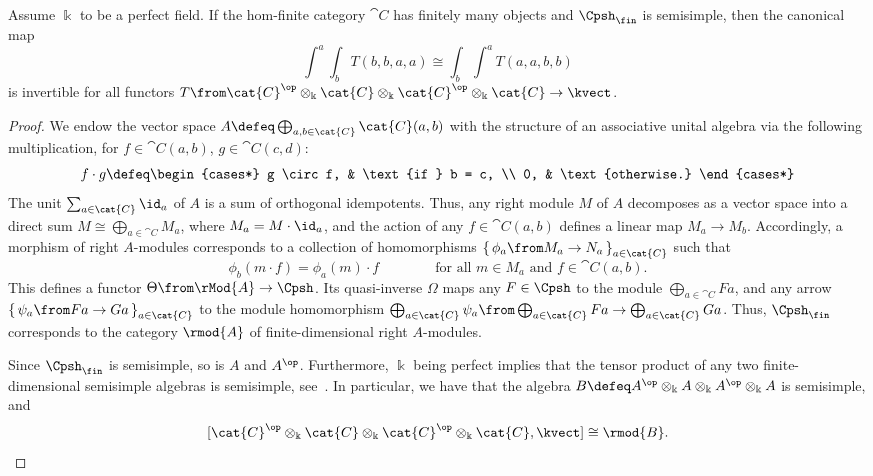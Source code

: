 \begin{lemma}\label{lem:semisimple-lets-ends-commute}
  Assume \(\Bbbk\) to be a perfect field.
  If the hom-finite category \(\cat{C}\) has finitely many objects
  and \(\Cpsh_{\fin}\)  is semisimple,
  then the canonical map
  \[
    \int^a\!\int_b T(b,b,a,a) \cong \int_b \int^a T(a,a,b,b)
  \]
  is invertible for all functors \(T \from \cat{C}^{\op}\otimes_{\Bbbk}\cat{C} \otimes_{\Bbbk}\cat{C}^{\op}\otimes_{\Bbbk}\cat{C} \to \kvect\).
\end{lemma}
\begin{proof}
  We endow the vector space \(A \defeq \bigoplus_{a, b\in\cat{C}}\cat{C}(a,b)\) with the structure of an associative unital algebra
  via the following multiplication, for \(f \in \cat{C}(a, b)\), \(g \in \cat{C}(c, d)\):
  \[
    f \cdot g \defeq
    \begin{cases*}
      g \circ f, & \text{if } b = c, \\
      0, & \text{otherwise.}
    \end{cases*}
  \]
  The unit \(\sum_{a \in\cat{C}} \id_a\) of \(A\)  is a sum of orthogonal idempotents.
  Thus, any right module \(M\) of \(A\) decomposes as a vector space into a direct sum \(M \cong \bigoplus_{a \in\cat{C}} M_a\), where \(M_a = M\cdot\id_a\), and the action of any  \(f \in\cat{C}(a,b)\)  defines a linear map \(M_a \to M_b\).
  Accordingly, a morphism of right \(A\)\hyp{}modules corresponds to a collection of homomorphisms \({\{\,\phi_a \from M_a \to N_a\,\}}_{a \in\cat{C}}\) such that
  \[
    \phi_b(m \cdot f) = \phi_a(m) \cdot f
    \qquad \qquad \text{for all \(m \in M_a\) and \(f\in \cat{C}(a,b)\)}.
  \]
  This defines a functor \(\Theta \from \rMod{A} \to \Cpsh\).
  Its quasi-inverse \(\Omega\)
  maps any \(F \in \Cpsh\) to the module \(\bigoplus_{a \in\cat{C}}Fa\),
  and any arrow \({\{\,\psi_a \from Fa \to Ga\,\}}_{a \in\cat{C}}\) to the module homomorphism \(\bigoplus_{a\in\cat{C}}\psi_a \from \bigoplus_{a \in\cat{C}} Fa \to \bigoplus_{a\in\cat{C}} Ga\).
  Thus, \(\Cpsh_{\fin}\) corresponds to the category \(\rmod{A}\) of finite\hyp{}dimensional right \(A\)\hyp{}modules.

  Since \(\Cpsh_{\fin}\) is semisimple, so is \(A\) and \(A^{\op}\).
  Furthermore, \(\Bbbk\) being perfect implies that the tensor product of any two finite\hyp{}dimensional semisimple algebras is semisimple, see~\cite[Section~3]{farb-dennis1993:Noncommutative}.
  In particular, we have that the algebra \(B \defeq A^{\op}\otimes_{\Bbbk}A \otimes_{\Bbbk}A^{\op}\otimes_{\Bbbk}A\) is semisimple,
  and
  \[
    [\cat{C}^{\op}\otimes_{\Bbbk}\cat{C} \otimes_{\Bbbk}\cat{C}^{\op}\otimes_{\Bbbk}\cat{C}, \kvect] \cong \rmod{B}.
  \]


\end{proof}

